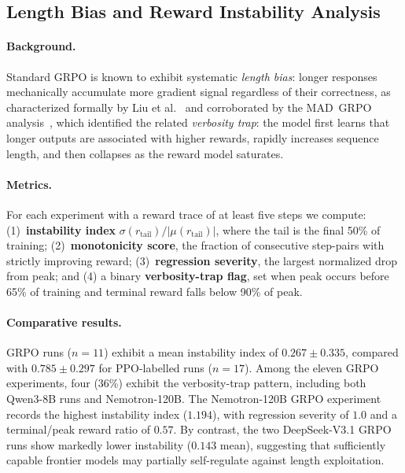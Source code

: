 \documentclass{article}
\begin{document}
\subsection{Length Bias and Reward Instability Analysis}
\label{sec:length_bias}

\paragraph{Background.}
Standard GRPO is known to exhibit systematic \emph{length bias}: longer responses
mechanically accumulate more gradient signal regardless of their correctness,
as characterized formally by Liu et al.~\cite{liu2025drgrpo} and corroborated
by the MAD~GRPO analysis~\cite{wang2025madgrpo}, which identified the related
\emph{verbosity trap}: the model first learns that longer outputs are associated
with higher rewards, rapidly increases sequence length, and then collapses as
the reward model saturates.

\paragraph{Metrics.}
For each experiment with a reward trace of at least five steps we compute:
(1)~\textbf{instability index} $\sigma(r_{\text{tail}}) / |\mu(r_{\text{tail}})|$,
where the tail is the final 50\% of training;
(2)~\textbf{monotonicity score}, the fraction of consecutive step-pairs with
strictly improving reward;
(3)~\textbf{regression severity}, the largest normalized drop from peak;
and (4) a binary \textbf{verbosity-trap flag}, set when peak occurs before 65\%
of training and terminal reward falls below 90\% of peak.

\paragraph{Comparative results.}
GRPO runs ($n = 11$) exhibit a mean instability index of $0.267 \pm 0.335$,
compared with $0.785 \pm 0.297$ for PPO-labelled runs ($n = 17$). Among the
eleven GRPO experiments, four (36\%) exhibit the verbosity-trap pattern,
including both Qwen3-8B runs and Nemotron-120B. The Nemotron-120B GRPO
experiment records the highest instability index ($1.194$), with regression
severity of $1.0$ and a terminal/peak reward ratio of $0.57$. By contrast,
the two DeepSeek-V3.1 GRPO runs show markedly lower instability ($0.143$
mean), suggesting that sufficiently capable frontier models may partially
self-regulate against length exploitation.
\end{document}
